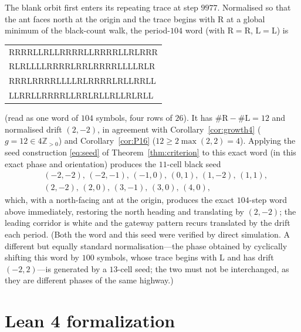 \documentclass[11pt,reqno]{amsart}
\theoremstyle{plain}
\theoremstyle{definition}
\newcommand{\Z}{\mathbb{Z}}
\newcommand{\growth}{g}
\newcommand{\turnR}{\mathrm{R}}
\newcommand{\turnL}{\mathrm{L}}
\begin{document}
The blank orbit first enters its repeating trace at step $9977$. Normalised so that
the ant faces north at the origin and the trace begins with $\turnR$ at a global
minimum of the black-count walk, the period-$104$ word (with $\turnR=$R, $\turnL=$L)
is
\begin{center}\ttfamily\small
\begin{tabular}{@{}l@{}}
RRRRLLRLLRRRRLLRRRRLLRLRRR\\
RLRLLLLRRRRLRRLRRRRLLLLRLR\\
RRRLRRRRLLLLRLRRRRLRLLRRLL\\
LLRRLLRRRRLLRRLRLLRLLRLRLL
\end{tabular}
\end{center}
(read as one word of $104$ symbols, four rows of $26$). It has
$\#\turnR-\#\turnL=12$ and normalised drift $(2,-2)$, in agreement with
Corollary~\ref{cor:growth4} ($\growth=12\in4\Z_{>0}$) and Corollary~\ref{cor:P16}
($12\ge 2\max(2,2)=4$). Applying the seed construction \eqref{eq:seed} of
Theorem~\ref{thm:criterion} to this exact word (in this exact phase and orientation)
produces the $11$-cell black seed
\[
\begin{aligned}
&(-2,-2),\,(-2,-1),\,(-1,0),\,(0,1),\,(1,-2),\,(1,1),\\
&(2,-2),\,(2,0),\,(3,-1),\,(3,0),\,(4,0),
\end{aligned}
\]
which, with a north-facing ant at the origin, produces the exact $104$-step word
above immediately, restoring the north heading and translating by $(2,-2)$; the
leading corridor is white and the gateway pattern recurs translated by the drift
each period. (Both the word and this seed were verified by direct simulation. A
different but equally standard normalisation---the phase obtained by cyclically
shifting this word by $100$ symbols, whose trace begins with $\turnL$ and has drift
$(-2,2)$---is generated by a $13$-cell seed; the two must not be interchanged, as
they are different phases of the same highway.)

\section{Lean 4 formalization}\label{app:lean}
\end{document}
